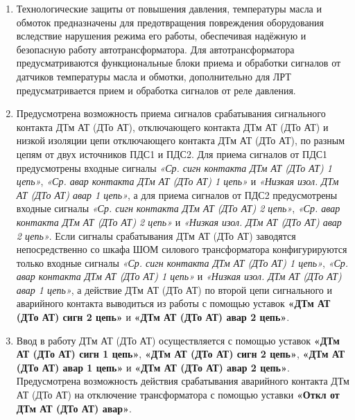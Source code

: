 \color{black}

\begin{enumerate}[label=\arabic{section}.\arabic{subsection}.\arabic*,  align=left, labelsep=4pt, leftmargin=0pt, itemindent=57pt]

\item
Технологические защиты от повышения давления, температуры масла и обмоток предназначены
для предотвращения повреждения оборудования вследствие нарушения режима его работы,
обеспечивая надёжную и безопасную работу автотрансформатора. Для автотрансформатора
предусматриваются функциональные блоки приема и обработки сигналов от датчиков температуры
масла и обмотки, дополнительно для ЛРТ предусматривается прием и обработка сигналов от реле
давления. 

\item
Предусмотрена возможность приема сигналов срабатывания сигнального контакта ДТм АТ (ДТо
АТ), отключающего контакта ДТм АТ (ДТо АТ) и низкой изоляции цепи отключающего контакта ДТм АТ
(ДТо АТ), по разным цепям от двух источников ПДС1 и ПДС2. Для приема сигналов от ПДС1
предусмотрены входные сигналы \textit{«Ср. сигн контакта ДТм АТ (ДТо АТ) 1 цепь»}, \textit{«Ср. авар контакта
ДТм АТ (ДТо АТ) 1 цепь»} и \textit{«Низкая изол. ДТм АТ (ДТо АТ) авар 1 цепь»}, а для приема сигналов от ПДС2
предусмотрены входные сигналы \textit{«Ср. сигн контакта ДТм АТ (ДТо АТ) 2 цепь»}, \textit{«Ср. авар контакта
ДТм АТ (ДТо АТ) 2 цепь»} и \textit{«Низкая изол. ДТм АТ (ДТо АТ) авар 2 цепь»}. Если сигналы срабатывания
ДТм АТ (ДТо АТ) заводятся непосредственно со шкафа ШОМ силового трансформатора
конфигурируются только входные сигналы \textit{«Ср. сигн контакта ДТм АТ (ДТо АТ) 1 цепь»}, \textit{«Ср. авар
контакта ДТм АТ (ДТо АТ) 1 цепь»} и \textit{«Низкая изол. ДТм АТ (ДТо АТ) авар 1 цепь»}, а действие ДТм АТ
(ДТо АТ) по второй цепи сигнального и аварийного контакта выводиться из работы с помощью уставок
\textbf{«ДТм АТ (ДТо АТ) сигн 2 цепь»} и \textbf{«ДТм АТ (ДТо АТ) авар 2 цепь»}.

\item
Ввод в работу ДТм АТ (ДТо АТ) осуществляется с помощью уставок \textbf{«ДТм АТ (ДТо АТ) сигн 1
цепь»}, \textbf{«ДТм АТ (ДТо АТ) сигн 2 цепь»}, \textbf{«ДТм АТ  (ДТо АТ) авар 1 цепь»} и \textbf{«ДТм АТ (ДТо АТ) авар 2
цепь»}. Предусмотрена возможность действия срабатывания аварийного контакта ДТм АТ (ДТо АТ) на отключение
трансформатора с помощью уставки \textbf{«Откл от ДТм АТ (ДТо АТ) авар»}.


\end{enumerate}
